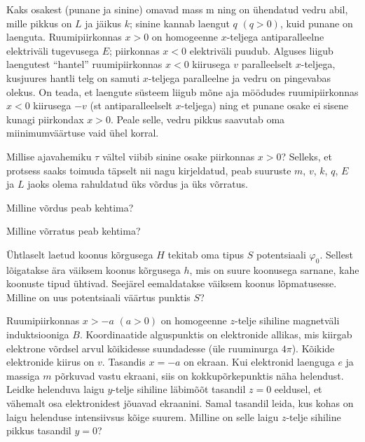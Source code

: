 \documentclass[a4paper,11pt,twocolumn]{article}
\begin{document}
\begin{question}[E-S 2010, P1]
    Kaks osakest (punane ja sinine) omavad mass m ning on ühendatud vedru abil, mille pikkus on $L$ ja jäikus $k$; sinine kannab laengut $q$ $(q > 0)$, kuid punane on laenguta. Ruumipiirkonnas $x > 0$ on homogeenne $x$-teljega antiparalleelne elektriväli tugevusega $E$; piirkonnas $x < 0$ elektriväli puudub. Alguses liigub laengutest \enquote{hantel} ruumipiirkonnas $x < 0$ kiirusega $v$ paralleelselt $x$-teljega, kusjuures hantli telg on samuti $x$-teljega paralleelne ja vedru on pingevabas olekus. On teada, et laengute süsteem liigub mõne aja möödudes ruumipiirkonnas $x < 0$ kiirusega $−v$ (st antiparalleelselt $x$-teljega) ning et punane osake ei sisene kunagi piirkondax $x > 0$. Peale selle, vedru pikkus saavutab oma miinimumväärtuse vaid ühel korral.
    \begin{subquestion}
    \item Millise ajavahemiku \(\tau\) vältel viibib sinine osake piirkonnas $x > 0$?  Selleks, et protsess saaks toimuda täpselt nii nagu kirjeldatud, peab suuruste $m$, $v$, $k$, $q$, $E$ ja $L$ jaoks olema rahuldatud üks võrdus ja üks võrratus.
    \item Milline võrdus peab kehtima?
    \item Milline võrratus peab kehtima?
    \end{subquestion}
\end{question}

\begin{question}[Piirk 2012, G10]
    Ühtlaselt laetud koonus kõrgusega $H$ tekitab oma tipus $S$ potentsiaali \(\varphi_0\). Sellest lõigatakse ära väiksem koonus kõrgusega $h$, mis on suure koonusega sarnane, kahe koonuste tipud ühtivad. Seejärel eemaldatakse väiksem koonus lõpmatusesse. Milline on uus potentsiaali väärtus punktis $S$?
\end{question}

\begin{question}[Lõppv 2017, G10]
    Ruumipiirkonnas $x > −a$ $(a > 0)$ on homogeenne $z$-telje sihiline magnetväli induktsiooniga $B$. Koordinaatide alguspunktis on elektronide allikas, mis kiirgab elektrone võrdsel arvul kõikidesse suundadesse (üle ruuminurga \(4\pi\)). Kõikide elektronide kiirus on $v$. Tasandis $x = −a$ on ekraan. Kui elektronid laenguga $e$ ja massiga $m$ põrkuvad vastu ekraani, siis on kokkupõrkepunktis näha helendust. Leidke helenduva laigu $y$-telje sihiline läbimõõt tasandil $z = 0$ eeldusel, et vähemalt osa elektronidest jõuavad ekraanini. Samal tasandil leida, kus kohas on laigu helenduse intensiivsus kõige suurem. Milline on selle laigu $z$-telje sihiline pikkus tasandil $y = 0$?
\end{question}
\end{document}

